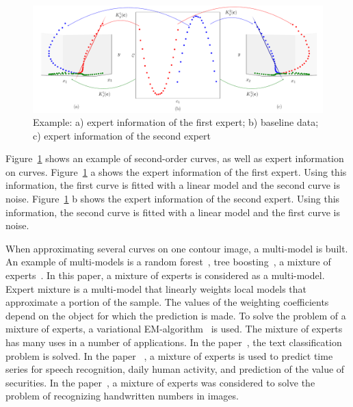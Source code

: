 \begin{figure}[h!]
     \includegraphics[width=\textwidth]{figures/explanation}
     \caption {Example: a) expert information of the first expert; b) baseline data; c) expert information of the second expert}
    \label{intro:fig2}
\end{figure}

Figure~\ref{intro:fig2} shows an example of second-order curves, as well as expert information on curves. Figure~\ref{intro:fig2} a shows the expert information of the first expert. Using this information, the first curve is fitted with a linear model and the second curve is noise. Figure~\ref{intro:fig2} b shows the expert information of the second expert. Using this information, the second curve is fitted with a linear model and the first curve is noise.

When approximating several curves on one contour image, a multi-model is built. An example of multi-models is a random forest~\cite{Ishwaran2012}, tree boosting~\cite{Tianqi2016}, a mixture of experts~\cite{Yuksel2012}. In this paper, a mixture of experts is considered as a multi-model. Expert mixture is a multi-model that linearly weights local models that approximate a portion of the sample. The values of the weighting coefficients depend on the object for which the prediction is made. To solve the problem of a mixture of experts, a variational EM-algorithm~\cite{Dempster1977} \cite{bishop2006} \cite{Peng1996} is used. The mixture of experts has many uses in a number of applications. In the paper~\cite{Estabrooks2001}, the text classification problem is solved. In the paper~\cite{Cheung1995} \cite{Weigend2000} \cite{Cao2003} \cite{Mossavat2010} \cite{Sminchisescu2007} \cite{Tuerk2001} \cite{Yumlu2003}, a mixture of experts is used to predict time series for speech recognition, daily human activity, and prediction of the value of securities. In the paper~\cite{Ebrahimpour2009}, a mixture of experts was considered to solve the problem of recognizing handwritten numbers in images.

